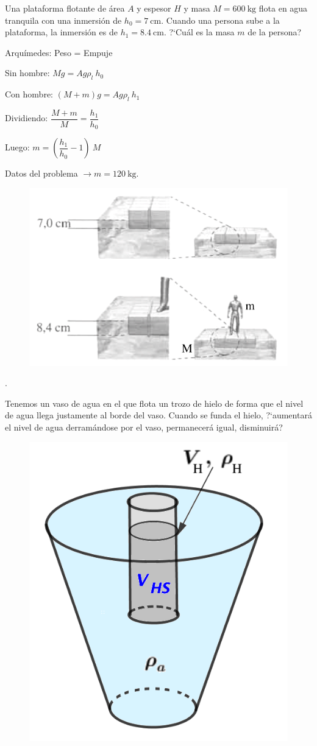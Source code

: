 \begin{prob}
	Una plataforma flotante de área $A$ y espesor $H$ y masa $M=600\ \mathrm{kg}$ flota en agua tranquila con una inmersión de $h_0=7\ \mathrm{cm}$. Cuando una persona sube a la plataforma, la inmersión es de $h_1=8.4\ \mathrm{cm}$. ?`Cuál es la masa $m$ de la persona?
\end{prob}

\begin{multicols}{2}
Arquímedes: Peso = Empuje

Sin hombre: $Mg=Ag \rho_l \ h_0$

Con hombre: $(M+m)g=Ag \rho_l \ h_1$

Dividiendo: $\dfrac {M+m}{M}=\dfrac {h_1}{h_0}$

Luego: $m=\left( \dfrac{h_1}{h_0}-1 \right)\ M$

Datos del problema $\to m=120\ \mathrm{kg}$.
\begin{figure}[H]
	\centering
	\includegraphics[width=.5\textwidth]{imagenes/imagenes07/T07IM20.png}
\end{figure}	
\end{multicols}
\begin{prob}
\begin{multicols}{2}.

Tenemos un vaso de agua en el que flota un trozo de hielo de forma que el nivel de agua llega justamente al borde del vaso. Cuando se funda el hielo, ?`aumentará el nivel de agua derramándose por el vaso, permanecerá igual, disminuirá?	
\begin{figure}[H]
	\centering
	\includegraphics[width=.2\textwidth]{imagenes/imagenes07/T07IM21.png}
\end{figure}
\end{multicols}
\end{prob}

